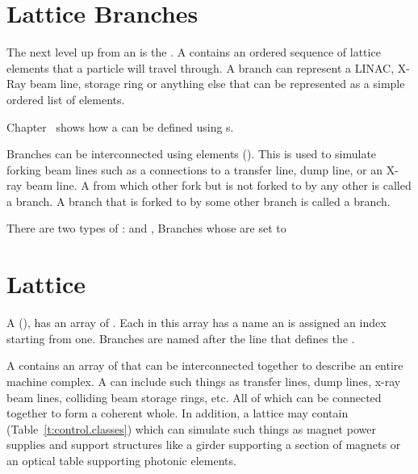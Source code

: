 \section{Lattice Branches}
\label{s:branch.def}

The next level up from an  is the . A 
 contains an ordered sequence of lattice elements that a particle will travel through. A
branch can represent a LINAC, X-Ray beam line, storage ring or anything else that can be represented
as a simple ordered list of elements.

Chapter~ shows how a  can be defined using s.

Branches can be interconnected using  elements (). This
is used to simulate forking beam lines such as a connections to a transfer line, dump line, or an
X-ray beam line. A  from which other  fork but is not forked to by any
other  is called a  branch. A branch that is forked to by some other branch
is called a  branch.

There are two types of :  and , 
Branches whose  are set to 


\section{Lattice}
\label{s:lattice.def}

A  (), has an array of . 
Each  in this array
has a name an is assigned an index starting from one. 
Branches are named after the line that defines the .

A  contains an array of  that can be interconnected 
together to describe an entire machine
complex. A  can include such things as transfer lines, dump lines, x-ray beam lines,
colliding beam storage rings, etc. All of which can be connected together to form a coherent whole. 
In addition, a lattice may contain  (Table~\ref{t:control.classes}) 
which can
simulate such things as magnet power supplies and support structures like a girder supporting
a section of magnets or an optical table supporting photonic elements.

